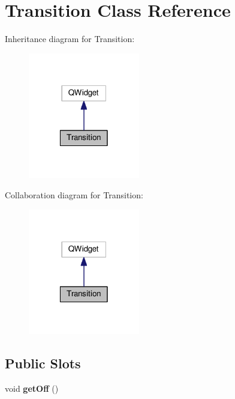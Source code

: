 \hypertarget{class_transition}{\section{Transition Class Reference}
\label{class_transition}
}


Inheritance diagram for Transition\-:
\nopagebreak
\begin{figure}[H]
\begin{center}
\leavevmode
\includegraphics[width=138pt]{class_transition__inherit__graph}
\end{center}
\end{figure}


Collaboration diagram for Transition\-:
\nopagebreak
\begin{figure}[H]
\begin{center}
\leavevmode
\includegraphics[width=138pt]{class_transition__coll__graph}
\end{center}
\end{figure}
\subsection*{Public Slots}
\begin{DoxyCompactItemize}
\item 
\hypertarget{class_transition_a74d10ea64197661946db6d02b35b4cf1}{void {\bfseries get\-Off} ()}\label{class_transition_a74d10ea64197661946db6d02b35b4cf1}

\end{DoxyCompactItemize}
